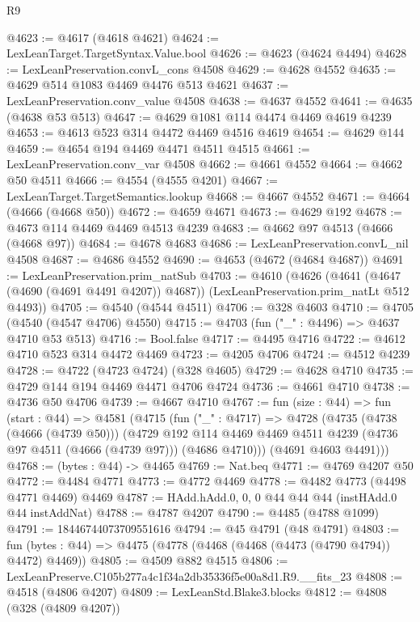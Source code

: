 \begin{lexlean}{R9}
\begin{coremodule}
@4623 := @4617 (@4618 @4621)
@4624 := LexLeanTarget.TargetSyntax.Value.bool
@4626 := @4623 (@4624 @4494)
@4628 := LexLeanPreservation.convL_cons @4508
@4629 := @4628 @4552
@4635 := @4629 @514 @1083 @4469 @4476 @513 @4621
@4637 := LexLeanPreservation.conv_value @4508
@4638 := @4637 @4552
@4641 := @4635 (@4638 @53 @513)
@4647 := @4629 @1081 @114 @4474 @4469 @4619 @4239
@4653 := @4613 @523 @314 @4472 @4469 @4516 @4619
@4654 := @4629 @144
@4659 := @4654 @194 @4469 @4471 @4511 @4515
@4661 := LexLeanPreservation.conv_var @4508
@4662 := @4661 @4552
@4664 := @4662 @50 @4511
@4666 := @4554 (@4555 @4201)
@4667 := LexLeanTarget.TargetSemantics.lookup
@4668 := @4667 @4552
@4671 := @4664 (@4666 (@4668 @50))
@4672 := @4659 @4671
@4673 := @4629 @192
@4678 := @4673 @114 @4469 @4469 @4513 @4239
@4683 := @4662 @97 @4513 (@4666 (@4668 @97))
@4684 := @4678 @4683
@4686 := LexLeanPreservation.convL_nil @4508
@4687 := @4686 @4552
@4690 := @4653 (@4672 (@4684 @4687))
@4691 := LexLeanPreservation.prim_natSub
@4703 := @4610
    (@4626
      (@4641 (@4647 (@4690 (@4691 @4491 @4207)) @4687))
      (LexLeanPreservation.prim_natLt @512 @4493))
@4705 := @4540 (@4544 @4511)
@4706 := @328 @4603
@4710 := @4705 (@4540 (@4547 @4706) @4550)
@4715 := @4703 (fun ("_" : @4496) => @4637 @4710 @53 @513)
@4716 := Bool.false
@4717 := @4495 @4716
@4722 := @4612 @4710 @523 @314 @4472 @4469
@4723 := @4205 @4706
@4724 := @4512 @4239
@4728 := @4722 (@4723 @4724) (@328 @4605)
@4729 := @4628 @4710
@4735 := @4729 @144 @194 @4469 @4471 @4706 @4724
@4736 := @4661 @4710
@4738 := @4736 @50 @4706
@4739 := @4667 @4710
@4767 := fun (size : @44) =>
  fun (start : @44) =>
  @4581
    (@4715
      (fun ("_" : @4717) =>
      @4728
        (@4735
          (@4738 (@4666 (@4739 @50)))
          (@4729
            @192
            @114
            @4469
            @4469
            @4511
            @4239
            (@4736 @97 @4511 (@4666 (@4739 @97)))
            (@4686 @4710)))
        (@4691 @4603 @4491)))
@4768 := (bytes : @44) -> @4465
@4769 := Nat.beq
@4771 := @4769 @4207 @50
@4772 := @4484 @4771
@4773 := @4772 @4469
@4778 := @4482 @4773 (@4498 @4771 @4469) @4469
@4787 := HAdd.hAdd.{0, 0, 0} @44 @44 @44 (instHAdd.{0} @44 instAddNat)
@4788 := @4787 @4207
@4790 := @4485 (@4788 @1099)
@4791 := 18446744073709551616
@4794 := @45 @4791 (@48 @4791)
@4803 := fun (bytes : @44) => @4475 (@4778 (@4468 (@4468 (@4473 (@4790 @4794)) @4472) @4469))
@4805 := @4509 @882 @4515
@4806 := LexLeanPreserve.C105b277a4c1f34a2db35336f5e00a8d1.R9.__fits_23
@4808 := @4518 (@4806 @4207)
@4809 := LexLeanStd.Blake3.blocks
@4812 := @4808 (@328 (@4809 @4207))

\end{coremodule}
\end{lexlean}
